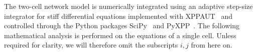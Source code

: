 The two-cell network model is numerically integrated using an adaptive step-size integrator for stiff differential equations implemented with XPPAUT~\citep{ermentrout2002} and controlled through the Python packages SciPy~\citep{scipy2020} and PyXPP~\citep{pyxpp}.
The following mathematical analysis is performed on the equations of a single cell.
Unless required for clarity, we will therefore omit the subscripts $i,j$ from here on.

